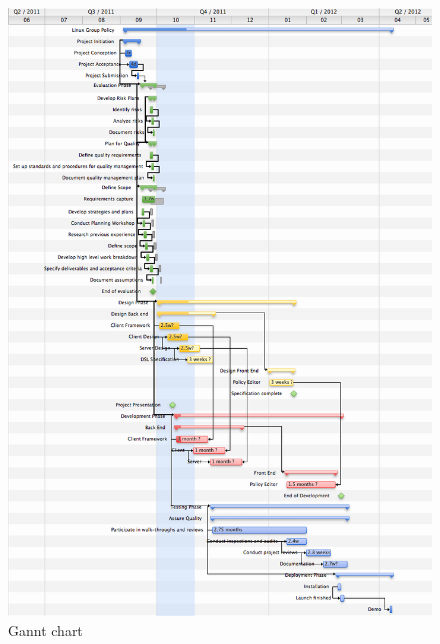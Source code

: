 		\begin{figure}[h!]
			\centering
			\includegraphics[width=16cm]{figures/gannt.png}
		 	\caption{Gannt chart}
		\end{figure}
